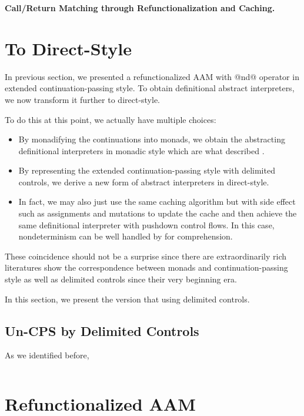 \documentclass[acmsmall,review,anonymous]{acmart}\settopmatter{printfolios=true,printccs=false,printacmref=false}
\begin{document}
\textbf{Call/Return Matching through Refunctionalization and Caching.}

\section{To Direct-Style} \label{directstyle}

In previous section, we presented a refunctionalized AAM with @nd@ operator
in extended continuation-passing style.
To obtain definitional abstract interpreters, we now transform it further to direct-style.

To do this at this point, we actually have multiple choices:
\begin{itemize}
  \item By monadifying the continuations into monads, we obtain the abstracting
    definitional interpreters in monadic style which are what \citeauthor{darais2017abstracting}
    described \cite{darais2017abstracting}.
  \item By representing the extended continuation-passing style with delimited controls,
    we derive a new form of abstract interpreters in direct-style.
  \item In fact, we may also just use the same caching algorithm but with side effect such as
    assignments and mutations to update the cache and then achieve the same
    definitional interpreter with pushdown control flows. In this case, nondeterminism can be
    well handled by for comprehension.
\end{itemize}

These coincidence should not be a surprise since there are extraordinarily rich literatures
show the correspondence between monads and continuation-passing style as well as delimited
controls since their very beginning era. 

In this section, we present the version that using delimited controls.

\subsection{Un-CPS by Delimited Controls} \label{uncps}

As we identified before,

\begin{lstlisting}
\end{lstlisting}

\section{Refunctionalized AAM}
\end{document}

